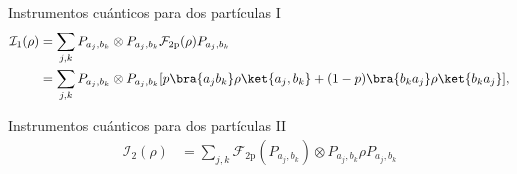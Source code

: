 \documentclass[svgnames,12pt,aspectratio=149]{beamer}
\begin{document}
\begin{frame}{Instrumentos cuánticos para dos partículas I}
  \begin{equation*}\label{eq:fisrtinstrument2p}
    \begin{split}
        \mathcal{I}_1{(\rho)}&=\sum_{j,k}P_{a_j,b_k}\otimes P_{a_j,b_k} \mathcal{F}_{2\text{p}}(\rho) P_{a_j,b_k}\\
        &=\sum_{j,k}P_{a_j,b_k}\otimes P_{a_j,b_k} [p \bra{a_j b_k}\rho \ket{a_j,b_k}+(1-p)\bra{b_k a_j }\rho \ket {b_k a_j}],
\end{split}
\end{equation*}
\begin{figure}[H]
\centering
{}
\caption*{}
\end{figure} 




\end{frame}

\begin{frame}{Instrumentos cuánticos para dos partículas II}
  \begin{equation*}\label{eq:second-instrument-2p}
    \begin{split}
        \mathcal{I}_2(\rho)&=\sum_{j,k}\mathcal{F}_{2\text{p}}(P_{a_j,b_k})\otimes P_{a_j,b_k} \rho P_{a_j,b_k}\\
    \end{split}
\end{equation*} 
\begin{figure}[H]
\centering
{}
\caption*{}
\end{figure} 

\end{frame}
\end{document}
